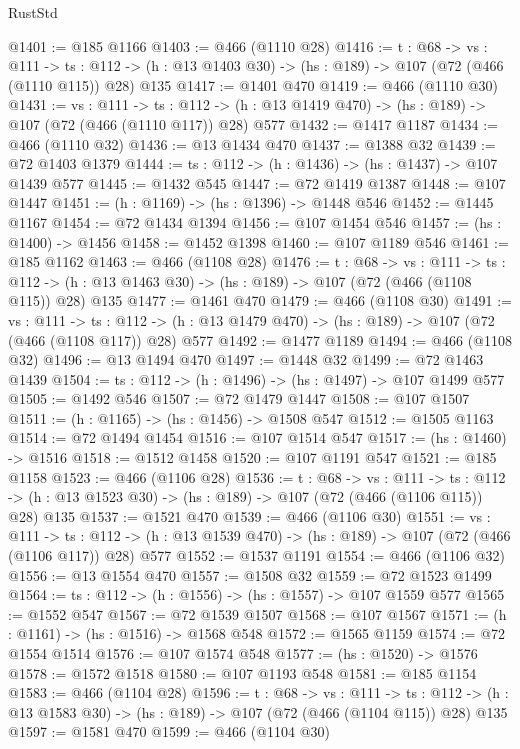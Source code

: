 \begin{lexlean}{RustStd}
\begin{coremodule}
{\begin{coremodule}
{{{{@1401 := @185 @1166
@1403 := @466 (@1110 @28)
@1416 := {t : @68} ->
  {vs : @111} ->
  {ts : @112} -> (h : @13 @1403 @30) -> (hs : @189) -> @107 (@72 (@466 (@1110 @115)) @28) @135
@1417 := @1401 @470
@1419 := @466 (@1110 @30)
@1431 := {vs : @111} ->
  {ts : @112} -> (h : @13 @1419 @470) -> (hs : @189) -> @107 (@72 (@466 (@1110 @117)) @28) @577
@1432 := @1417 @1187
@1434 := @466 (@1110 @32)
@1436 := @13 @1434 @470
@1437 := @1388 @32
@1439 := @72 @1403 @1379
@1444 := {ts : @112} -> (h : @1436) -> (hs : @1437) -> @107 @1439 @577
@1445 := @1432 @545
@1447 := @72 @1419 @1387
@1448 := @107 @1447
@1451 := (h : @1169) -> (hs : @1396) -> @1448 @546
@1452 := @1445 @1167
@1454 := @72 @1434 @1394
@1456 := @107 @1454 @546
@1457 := (hs : @1400) -> @1456
@1458 := @1452 @1398
@1460 := @107 @1189 @546
@1461 := @185 @1162
@1463 := @466 (@1108 @28)
@1476 := {t : @68} ->
  {vs : @111} ->
  {ts : @112} -> (h : @13 @1463 @30) -> (hs : @189) -> @107 (@72 (@466 (@1108 @115)) @28) @135
@1477 := @1461 @470
@1479 := @466 (@1108 @30)
@1491 := {vs : @111} ->
  {ts : @112} -> (h : @13 @1479 @470) -> (hs : @189) -> @107 (@72 (@466 (@1108 @117)) @28) @577
@1492 := @1477 @1189
@1494 := @466 (@1108 @32)
@1496 := @13 @1494 @470
@1497 := @1448 @32
@1499 := @72 @1463 @1439
@1504 := {ts : @112} -> (h : @1496) -> (hs : @1497) -> @107 @1499 @577
@1505 := @1492 @546
@1507 := @72 @1479 @1447
@1508 := @107 @1507
@1511 := (h : @1165) -> (hs : @1456) -> @1508 @547
@1512 := @1505 @1163
@1514 := @72 @1494 @1454
@1516 := @107 @1514 @547
@1517 := (hs : @1460) -> @1516
@1518 := @1512 @1458
@1520 := @107 @1191 @547
@1521 := @185 @1158
@1523 := @466 (@1106 @28)
@1536 := {t : @68} ->
  {vs : @111} ->
  {ts : @112} -> (h : @13 @1523 @30) -> (hs : @189) -> @107 (@72 (@466 (@1106 @115)) @28) @135
@1537 := @1521 @470
@1539 := @466 (@1106 @30)
@1551 := {vs : @111} ->
  {ts : @112} -> (h : @13 @1539 @470) -> (hs : @189) -> @107 (@72 (@466 (@1106 @117)) @28) @577
@1552 := @1537 @1191
@1554 := @466 (@1106 @32)
@1556 := @13 @1554 @470
@1557 := @1508 @32
@1559 := @72 @1523 @1499
@1564 := {ts : @112} -> (h : @1556) -> (hs : @1557) -> @107 @1559 @577
@1565 := @1552 @547
@1567 := @72 @1539 @1507
@1568 := @107 @1567
@1571 := (h : @1161) -> (hs : @1516) -> @1568 @548
@1572 := @1565 @1159
@1574 := @72 @1554 @1514
@1576 := @107 @1574 @548
@1577 := (hs : @1520) -> @1576
@1578 := @1572 @1518
@1580 := @107 @1193 @548
@1581 := @185 @1154
@1583 := @466 (@1104 @28)
@1596 := {t : @68} ->
  {vs : @111} ->
  {ts : @112} -> (h : @13 @1583 @30) -> (hs : @189) -> @107 (@72 (@466 (@1104 @115)) @28) @135
@1597 := @1581 @470
@1599 := @466 (@1104 @30)
}}}}
\end{coremodule}}
\end{coremodule}
\end{lexlean}
